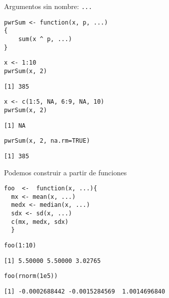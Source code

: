 \documentclass[xcolor={usenames,svgnames,dvipsnames}]{beamer}
\begin{document}
\begin{frame}[fragile,label={sec:orgdd79040}]{Argumentos sin nombre: \texttt{...}}
 \lstset{language=r,label= ,caption= ,captionpos=b,numbers=none}
\begin{lstlisting}
pwrSum <- function(x, p, ...)
{
    sum(x ^ p, ...)
}
\end{lstlisting}

\lstset{language=r,label= ,caption= ,captionpos=b,numbers=none}
\begin{lstlisting}
x <- 1:10
pwrSum(x, 2)
\end{lstlisting}

\begin{verbatim}
[1] 385
\end{verbatim}

\lstset{language=r,label= ,caption= ,captionpos=b,numbers=none}
\begin{lstlisting}
x <- c(1:5, NA, 6:9, NA, 10)
pwrSum(x, 2)
\end{lstlisting}

\begin{verbatim}
[1] NA
\end{verbatim}

\lstset{language=r,label= ,caption= ,captionpos=b,numbers=none}
\begin{lstlisting}
pwrSum(x, 2, na.rm=TRUE)
\end{lstlisting}

\begin{verbatim}
[1] 385
\end{verbatim}
\end{frame}

\begin{frame}[fragile,label={sec:org9032579}]{Podemos construir a partir de funciones}
 \lstset{language=r,label= ,caption= ,captionpos=b,numbers=none}
\begin{lstlisting}
foo  <-  function(x, ...){
  mx <- mean(x, ...)
  medx <- median(x, ...)
  sdx <- sd(x, ...)
  c(mx, medx, sdx)
  }
\end{lstlisting}

\lstset{language=r,label= ,caption= ,captionpos=b,numbers=none}
\begin{lstlisting}
foo(1:10)
\end{lstlisting}

\begin{verbatim}
[1] 5.50000 5.50000 3.02765
\end{verbatim}

\lstset{language=r,label= ,caption= ,captionpos=b,numbers=none}
\begin{lstlisting}
foo(rnorm(1e5))
\end{lstlisting}

\begin{verbatim}
[1] -0.0002688442 -0.0015284569  1.0014696840
\end{verbatim}
\end{frame}
\end{document}
